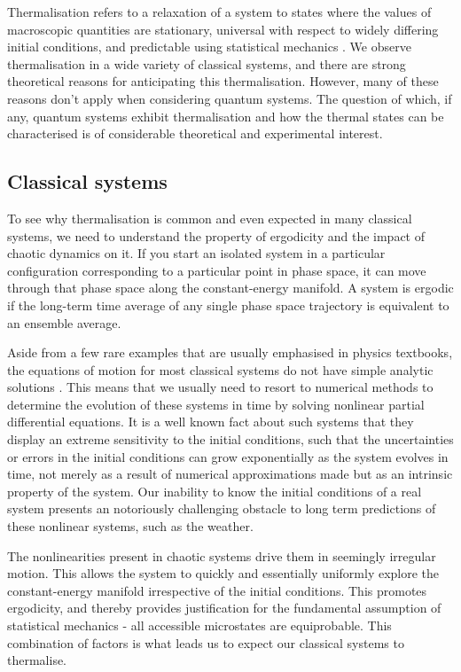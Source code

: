 \documentclass[a4paper, 10pt]{article}
\theoremstyle{plain}
\begin{document}
Thermalisation refers to a relaxation of a system to states where the values
of macroscopic quantities are stationary, universal with respect to widely
differing initial conditions, and predictable using statistical mechanics
\cite{Rigol2008}. We observe thermalisation in a wide variety of classical
systems, and there are strong theoretical reasons for anticipating this
thermalisation. However, many of these reasons don't apply when considering
quantum systems. The question of which, if any, quantum systems exhibit
thermalisation and how the thermal states can be characterised is of
considerable theoretical and experimental interest.

\subsection{Classical systems}

To see why thermalisation is common and even expected in many classical
systems, we need to understand the property of ergodicity and the impact of
chaotic dynamics on it. If you start an isolated system in a particular
configuration corresponding to a particular point in phase space, it can move
through that phase space along the constant-energy manifold. A system is
ergodic if the long-term time average of any single phase space trajectory
is equivalent to an ensemble average. 

Aside from a few rare examples that are usually emphasised in physics textbooks,
the equations of motion for most classical systems do not have simple analytic
solutions \cite{Jensen1992}. This means that we usually need to resort to
numerical methods to determine the evolution of these systems in time by solving
nonlinear partial differential equations. It is a well known fact about such
systems that they display an extreme sensitivity to the initial conditions, such
that the uncertainties or errors in the initial conditions can grow
exponentially as the system evolves in time, not merely as a result of numerical
approximations made but as an intrinsic property of the system. Our inability to
know the initial conditions of a real system presents an notoriously
challenging obstacle to long term predictions of these nonlinear systems, such
as the weather.

The nonlinearities present in chaotic systems drive them in seemingly irregular
motion. This allows the system to quickly and essentially uniformly explore the
constant-energy manifold irrespective of the initial conditions. This promotes
ergodicity, and thereby provides justification for the fundamental assumption
of statistical mechanics - all accessible microstates are equiprobable.
This combination of factors is what leads us to expect
our classical systems to thermalise.
\end{document}
